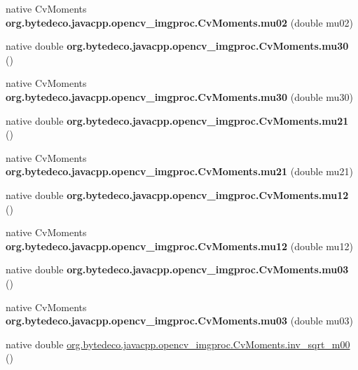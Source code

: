 \begin{DoxyCompactItemize}
native Cv\+Moments {\bfseries org.\+bytedeco.\+javacpp.\+opencv\+\_\+imgproc.\+Cv\+Moments.\+mu02} (double mu02)
\item 
\mbox{\label{group__imgproc_ga24a43d8604cfebef443fc2e87a25ddf3}} 
native double {\bfseries org.\+bytedeco.\+javacpp.\+opencv\+\_\+imgproc.\+Cv\+Moments.\+mu30} ()
\item 
\mbox{\label{group__imgproc_ga2acc930aea81876b1ea7acaa179ba501}} 
native Cv\+Moments {\bfseries org.\+bytedeco.\+javacpp.\+opencv\+\_\+imgproc.\+Cv\+Moments.\+mu30} (double mu30)
\item 
\mbox{\label{group__imgproc_ga5963381d7c0ea758134868eb00828b2c}} 
native double {\bfseries org.\+bytedeco.\+javacpp.\+opencv\+\_\+imgproc.\+Cv\+Moments.\+mu21} ()
\item 
\mbox{\label{group__imgproc_ga39ab2e91b0c221ff28dca13b66051b06}} 
native Cv\+Moments {\bfseries org.\+bytedeco.\+javacpp.\+opencv\+\_\+imgproc.\+Cv\+Moments.\+mu21} (double mu21)
\item 
\mbox{\label{group__imgproc_ga88c8b515b486313ac722ef5b6136a0a8}} 
native double {\bfseries org.\+bytedeco.\+javacpp.\+opencv\+\_\+imgproc.\+Cv\+Moments.\+mu12} ()
\item 
\mbox{\label{group__imgproc_ga72cf54fd75cdea03b8ec3cacbd72dbe3}} 
native Cv\+Moments {\bfseries org.\+bytedeco.\+javacpp.\+opencv\+\_\+imgproc.\+Cv\+Moments.\+mu12} (double mu12)
\item 
\mbox{\label{group__imgproc_gaebdac0736cebf0b1ad3baab9f0643594}} 
native double {\bfseries org.\+bytedeco.\+javacpp.\+opencv\+\_\+imgproc.\+Cv\+Moments.\+mu03} ()
\item 
\mbox{\label{group__imgproc_ga30df6c3bce17e1a90420f90a3b50c1f6}} 
native Cv\+Moments {\bfseries org.\+bytedeco.\+javacpp.\+opencv\+\_\+imgproc.\+Cv\+Moments.\+mu03} (double mu03)
\item 
native double \hyperlink{group__imgproc_gaba1c363c6908611dc7684005e1e5895c}{org.\+bytedeco.\+javacpp.\+opencv\+\_\+imgproc.\+Cv\+Moments.\+inv\+\_\+sqrt\+\_\+m00} ()
\item 

\end{DoxyCompactItemize}

